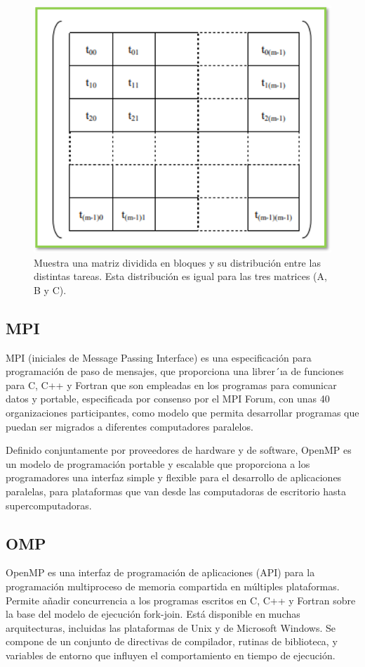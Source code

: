 \documentclass[10pt]{IEEEtran}
\begin{document}
\begin{figure}[H]
  \centering
  \includegraphics[width=.9\linewidth]{figs/matrizfox.png}
  \caption{Muestra una matriz dividida en bloques y su distribución entre las distintas tareas. Esta distribución es igual para las tres matrices (A, B y C).}
  \label{fig:example}
\end{figure}

\subsection{MPI}
MPI (iniciales de Message Passing Interface) es una especificación para programación de paso de mensajes, que proporciona una librer´ıa de funciones para C, C++ y Fortran que son empleadas en los programas para comunicar datos y portable, especificada por consenso por el MPI Forum, con unas 40 organizaciones participantes, como modelo que permita desarrollar programas que puedan ser migrados a diferentes computadores paralelos.

Definido conjuntamente por proveedores de hardware y de software, OpenMP es un modelo de programación portable y escalable que proporciona a los programadores una interfaz simple y flexible para el desarrollo de aplicaciones paralelas, para plataformas que van desde las computadoras de escritorio hasta supercomputadoras.

\subsection{OMP}
OpenMP es una interfaz de programación de aplicaciones (API) para la programación multiproceso de memoria compartida en múltiples plataformas. Permite añadir concurrencia a los programas escritos en C, C++ y Fortran sobre la base del modelo de ejecución fork-join. Está disponible en muchas arquitecturas, incluidas las plataformas de Unix y de Microsoft Windows. Se compone de un conjunto de directivas de compilador, rutinas de biblioteca, y variables de entorno que influyen el comportamiento en tiempo de ejecución.
\end{document}
